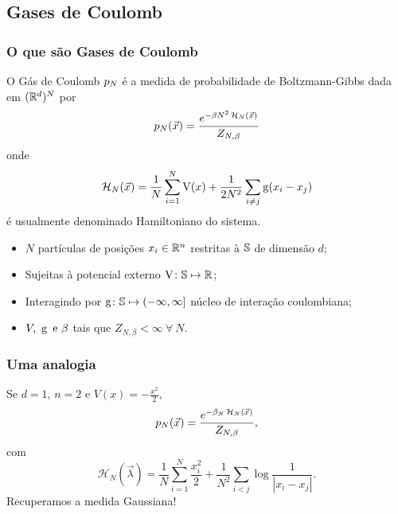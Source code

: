 
\subsection{Gases de Coulomb}
\begin{frame}
	\frametitle{O que são Gases de Coulomb}
	O Gás de Coulomb $p_N$ é a medida de probabilidade de Boltzmann-Gibbs dada em $(\mathbb{R}^d)^N$ por
	\[
		p_N(\vec{x}) = \frac{e^{-\beta N^2 \operatorname{\mathcal{H}}_N(\vec{x})}}{Z_{N,\beta}}
	\] 
	onde 
	\[
		\operatorname{\mathcal{H}}_N(\vec{x}) = \frac{1}{N} \sum_{i = 1}^{N} \operatorname{V}(x) + \frac{1}{2N^2} \sum_{i \neq j} \operatorname{g}(x_i - x_j)
	\]
	é usualmente denominado Hamiltoniano do sistema.
\end{frame}
\begin{frame}
	\begin{itemize}
	\item $N$ partículas de posições $x_i \in \mathbb{R}^n$ restritas à $\mathbb{S}$ de dimensão $d$;
	\pause
	\item Sujeitas à potencial externo $\operatorname{V} \colon \mathbb{S} \mapsto \mathbb{R}$;
	\pause
	\item Interagindo por $\operatorname{g} \colon \mathbb{S} \mapsto (-\infty, \infty]$ núcleo de interação coulombiana;
	\pause
	\item $V, \ \operatorname{g} \ \text{e} \ \beta$ tais que  $Z_{N, \beta} < \infty \ \forall \ N$.
	\end{itemize}
\end{frame}
\begin{frame}
	\frametitle{Uma analogia}	
	Se $d = 1$, $n=2$ e $V(x) = -\frac{x^2}{2}$,
	\pause
	\[
	p_N(\vec{x}) = \frac{e^{-\beta_N \operatorname{\mathcal{H}}_N(\vec{x})}}{Z_{N,\beta}},
	\]
	com 
	\[
	\mathcal{H}_N(\vec{\lambda}) = \frac{1}{N}\sum_{i = 1}^{N} \frac{x_i^2}{2} + \frac{1}{N^2} \sum_{i < j} \log{\frac{1}{|x_i - x_j|}}.
	\]
	Recuperamos a medida Gaussiana!
\end{frame}

